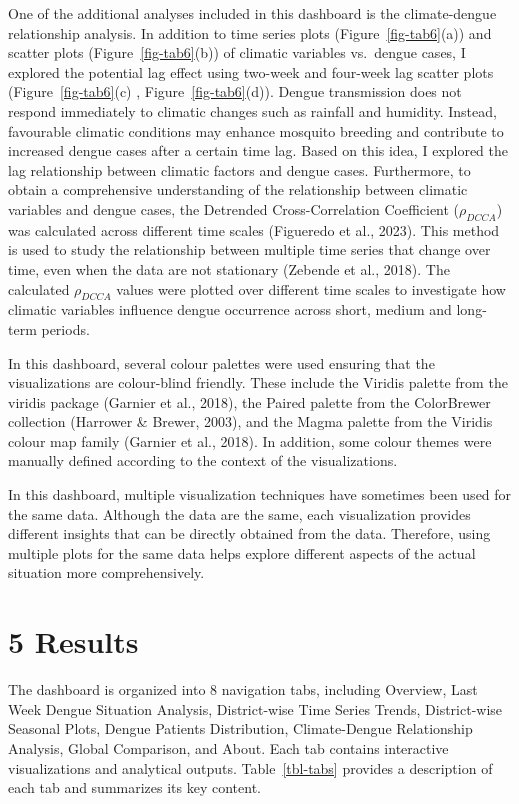 \documentclass[
]{article}
\begin{document}
One of the additional analyses included in this dashboard is the
climate-dengue relationship analysis. In addition to time series plots
(Figure~\ref{fig-tab6}(a)) and scatter plots (Figure~\ref{fig-tab6}(b))
of climatic variables vs.~dengue cases, I explored the potential lag
effect using two-week and four-week lag scatter plots
(Figure~\ref{fig-tab6}(c) , Figure~\ref{fig-tab6}(d)). Dengue
transmission does not respond immediately to climatic changes such as
rainfall and humidity. Instead, favourable climatic conditions may
enhance mosquito breeding and contribute to increased dengue cases after
a certain time lag. Based on this idea, I explored the lag relationship
between climatic factors and dengue cases. Furthermore, to obtain a
comprehensive understanding of the relationship between climatic
variables and dengue cases, the Detrended Cross-Correlation Coefficient
(\(\rho_{DCCA}\)) was calculated across different time scales (Figueredo
et al., 2023). This method is used to study the relationship between
multiple time series that change over time, even when the data are not
stationary (Zebende et al., 2018). The calculated \(\rho_{DCCA}\) values
were plotted over different time scales to investigate how climatic
variables influence dengue occurrence across short, medium and long-term
periods.

In this dashboard, several colour palettes were used ensuring that the
visualizations are colour-blind friendly. These include the Viridis
palette from the viridis package (Garnier et al., 2018), the Paired
palette from the ColorBrewer collection (Harrower \& Brewer, 2003), and
the Magma palette from the Viridis colour map family (Garnier et al.,
2018). In addition, some colour themes were manually defined according
to the context of the visualizations.

In this dashboard, multiple visualization techniques have sometimes been
used for the same data. Although the data are the same, each
visualization provides different insights that can be directly obtained
from the data. Therefore, using multiple plots for the same data helps
explore different aspects of the actual situation more comprehensively.

\section{5 Results}\label{results}

The dashboard is organized into 8 navigation tabs, including Overview,
Last Week Dengue Situation Analysis, District-wise Time Series Trends,
District-wise Seasonal Plots, Dengue Patients Distribution,
Climate-Dengue Relationship Analysis, Global Comparison, and About. Each
tab contains interactive visualizations and analytical outputs.
Table~\ref{tbl-tabs} provides a description of each tab and summarizes
its key content.
\end{document}
